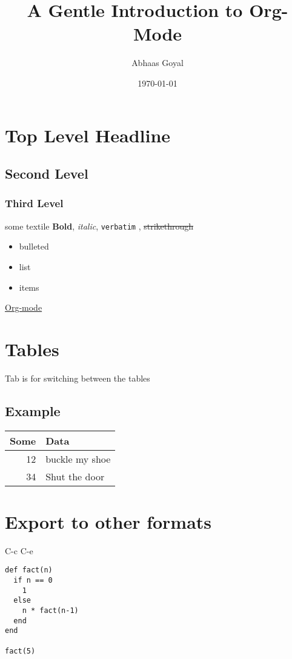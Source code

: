\documentclass[11pt]{article}
\author{Abhaas Goyal}
\date{\today}
\title{A Gentle Introduction to Org-Mode}
\begin{document}
\maketitle
\section{Top Level Headline}
\label{sec:org6f2b443}
\subsection{Second Level}
\label{sec:org581f9a3}
\subsubsection{Third Level}
\label{sec:orgbf4ff21}
some textile
\textbf{Bold}, \emph{italic}, \texttt{verbatim} , \sout{strikethrough}
\begin{itemize}
\item bulleted
\item list
\item items
\end{itemize}

\href{http://orgmode.org/}{Org-mode}

\section{Tables}
\label{sec:orgb4caf07}
Tab is for switching between the tables
\subsection{Example}
\label{sec:org83b7804}
\begin{center}
\begin{tabular}{rl}
Some & Data\\
\hline
12 & buckle my shoe\\
34 & Shut the door\\
\end{tabular}
\end{center}

\section{Export to other formats}
\label{sec:org9581f79}
C-c C-e

\begin{verbatim}
def fact(n)
  if n == 0
    1
  else
    n * fact(n-1)
  end
end

fact(5)
\end{verbatim}
\end{document}
